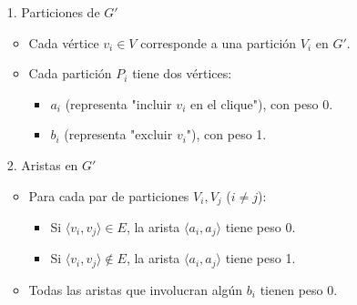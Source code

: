 \documentclass[letterpaper, 12pt]{report}
\begin{document}
\begin{itemize}
    \item[1.] Particiones de $ G' $
    \begin{itemize}
        \item Cada vértice $ v_i \in V $ corresponde a una partición $ V_i $ en $ G' $.  
        \item Cada partición $ P_i $ tiene dos vértices:  
        \begin{itemize}
            \item $ a_i $ (representa "incluir $ v_i $ en el clique"), con peso 0. 
            \item $ b_i $ (representa "excluir $ v_i $"), con peso 1.  
        \end{itemize}
    \end{itemize}
    \item[2.] Aristas en $ G' $
    \begin{itemize}
        \item Para cada par de particiones $ V_i, V_j $ ($ i \neq j $): 
        \begin{itemize}
            \item Si $ \langle v_i, v_j \rangle \in E $, la arista $ \langle a_i, a_j \rangle $ tiene peso 0.  
            \item Si $ \langle v_i, v_j \rangle \notin E $, la arista $ \langle a_i, a_j \rangle $ tiene peso 1.  
        \end{itemize}
        \item Todas las aristas que involucran algún $ b_i $ tienen peso $ 0 $.  
    \end{itemize}    
\end{itemize}


\end{document}

